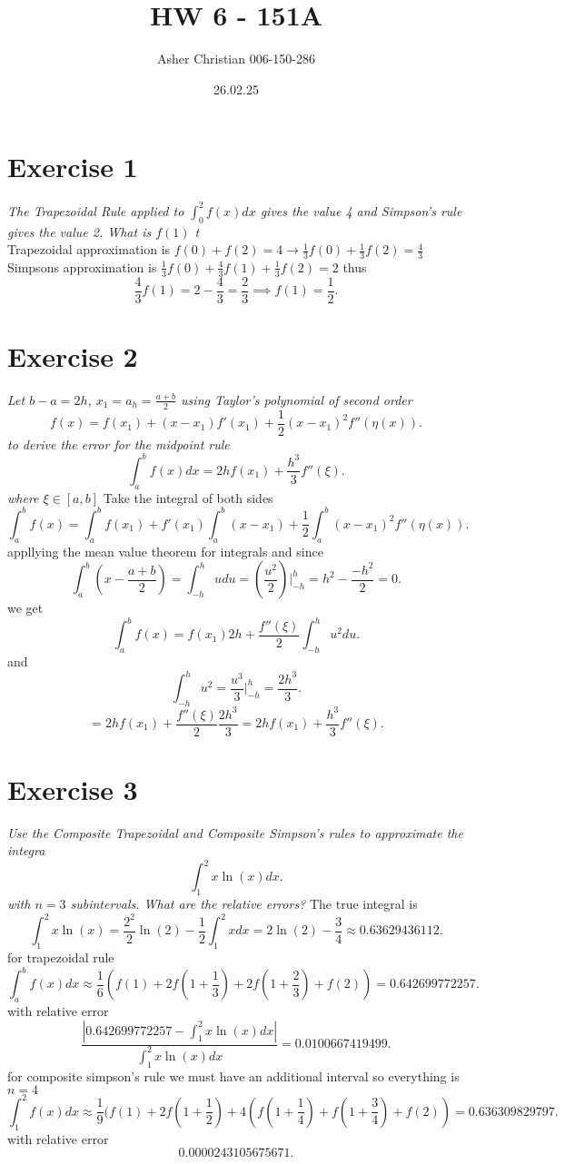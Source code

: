 \documentclass{amsart}
\title{HW 6 - 151A}
\author{Asher Christian 006-150-286}
\date{ 26.02.25}
\begin{document}
    \maketitle
    \section{Exercise 1}
    \emph{
        The Trapezoidal Rule applied to $\int_{0}^{2}f(x)dx$ gives the value 4
        and Simpson's rule gives the value 2. What is $f(1)$ t
    }\\
    Trapezoidal approximation is $f(0) + f(2) = 4 \rightarrow \frac{1}{3}f(0) + \frac{1}{3}f(2) = \frac{4}{3}$ 
    Simpsons approximation is $\frac{1}{3}f(0) + \frac{4}{3}f(1) + \frac{1}{3}f(2) = 2$ thus
    \[
    \frac{4}{3}f(1) = 2 - \frac{4}{3} = \frac{2}{3} \implies f(1) = \frac{1}{2}
    .\] 

    \section{Exercise 2}
    \emph{
        Let $b-a = 2h$, $x_1 = a_h = \frac{a+b}{2}$ using Taylor's polynomial of second order
        \[
        f(x) = f(x_1) + (x-x_1)f'(x_1) + \frac{1}{2}(x-x_1)^2f''(\eta (x))
        .\] 
        to derive the error for the midpoint rule
        \[
        \int_{a}^{b}f(x)dx = 2hf(x_1) + \frac{h^{3}}{3}f''(\xi)
        .\] 
        where $\xi \in [a,b]$
    }
    Take the integral of both sides
    \[
    \int_{a}^{b}f(x) = \int_{a}^{b}f(x_1) + f'(x_1)\int_{a}^{b}(x-x_1) + \frac{1}{2}\int_{a}^{b}(x-x_1)^2f''(\eta (x))
    .\] 
    appllying the mean value theorem for integrals and since
    \[
        \int_{a}^{b}(x-\frac{a+b}{2}) = \int_{-h}^{h}udu= (\frac{u^2}{2})|^{h}_{-h} = h^2-\frac{-h^2}{2} = 0
    .\] 
    we get
    \[
    \int_{a}^{b}f(x) = f(x_1)2h + \frac{f''(\xi)}{2}\int_{-h}^{h}u^2du
    .\] 
    and
    \[
        \int_{-h}^{h}u^2 = \frac{u^{3}}{3}\Big|^{h}_{-h}  = \frac{2h^{3}}{3}
    .\] 
    \[
    =2hf(x_1) + \frac{f''(\xi)}{2}\frac{2h^{3}}{3} = 2hf(x_1) + \frac{h^{3}}{3}f''(\xi)
    .\] 

    \section{Exercise 3}
    \emph{
        Use the Composite Trapezoidal and Composite Simpson's rules to approximate the integra
        \[
        \int_{1}^{2}x\ln(x)dx
        .\] 
        with $n=3$ subintervals. What are the relative errors?
    }
    The true integral is
    \[
    \int_{1}^{2}x\ln(x) = \frac{2^2}{2}\ln(2) - \frac{1}{2}\int_{1}^{2}xdx = 2\ln(2) - \frac{3}{4} \approx 0.63629436112
    .\] 
    for trapezoidal rule
    \[
        \int_{a}^{b}f(x)dx \approx \frac{1}{6}(f(1) + 2f(1 +\frac{1}{3}) + 2f(1 + \frac{2}{3}) + f(2)) = 0.642699772257
    .\] 
    with relative error
    \[
        \frac{|0.642699772257 - \int_{1}^{2}x\ln(x)dx|}{\int_{1}^{2}x\ln(x)dx} =  0.0100667419499
    .\] 
    for composite simpson's rule we must have an additional interval so everything is $n=4$
    \[
    \int_{1}^{2}f(x)dx \approx \frac{1}{9}(f(1) + 2f(1 + \frac{1}{2}) + 4(f(1 + \frac{1}{4})+f(1+\frac{3}{4}) + f(2)) = 0.636309829797
    .\] 
    with relative error
    \[
    0.0000243105675671
    .\] 
\end{document}
